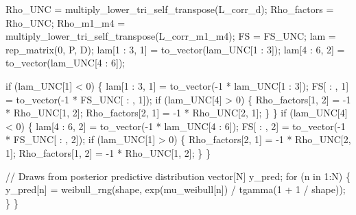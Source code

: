 \documentclass[
  letterpaper,
  DIV=11,
  numbers=noendperiod]{scrreprt}
\newenvironment{Shaded}{\begin{snugshade}}{\end{snugshade}}
\newcommand{\CommentTok}[1]{\textcolor[rgb]{0.37,0.37,0.37}{#1}}
\newcommand{\ControlFlowTok}[1]{\textcolor[rgb]{0.00,0.23,0.31}{#1}}
\newcommand{\DataTypeTok}[1]{\textcolor[rgb]{0.68,0.00,0.00}{#1}}
\newcommand{\DecValTok}[1]{\textcolor[rgb]{0.68,0.00,0.00}{#1}}
\newcommand{\NormalTok}[1]{\textcolor[rgb]{0.00,0.23,0.31}{#1}}
\begin{document}
\begin{Shaded}
\begin{Highlighting}[]
\NormalTok{  Rho\_UNC = multiply\_lower\_tri\_self\_transpose(L\_corr\_d);}
\NormalTok{  Rho\_factors = Rho\_UNC;}
\NormalTok{  Rho\_m1\_m4 = multiply\_lower\_tri\_self\_transpose(L\_corr\_m1\_m4);}
\NormalTok{  FS = FS\_UNC;}
\NormalTok{  lam = rep\_matrix(}\DecValTok{0}\NormalTok{, P, D);}
\NormalTok{  lam[}\DecValTok{1}\NormalTok{ : }\DecValTok{3}\NormalTok{, }\DecValTok{1}\NormalTok{] = to\_vector(lam\_UNC[}\DecValTok{1}\NormalTok{ : }\DecValTok{3}\NormalTok{]);}
\NormalTok{  lam[}\DecValTok{4}\NormalTok{ : }\DecValTok{6}\NormalTok{, }\DecValTok{2}\NormalTok{] = to\_vector(lam\_UNC[}\DecValTok{4}\NormalTok{ : }\DecValTok{6}\NormalTok{]);}
  
  \ControlFlowTok{if}\NormalTok{ (lam\_UNC[}\DecValTok{1}\NormalTok{] \textless{} }\DecValTok{0}\NormalTok{) \{}
\NormalTok{    lam[}\DecValTok{1}\NormalTok{ : }\DecValTok{3}\NormalTok{, }\DecValTok{1}\NormalTok{] = to\_vector({-}}\DecValTok{1}\NormalTok{ * lam\_UNC[}\DecValTok{1}\NormalTok{ : }\DecValTok{3}\NormalTok{]);}
\NormalTok{    FS[ : , }\DecValTok{1}\NormalTok{] = to\_vector({-}}\DecValTok{1}\NormalTok{ * FS\_UNC[ : , }\DecValTok{1}\NormalTok{]);}
    \ControlFlowTok{if}\NormalTok{ (lam\_UNC[}\DecValTok{4}\NormalTok{] \textgreater{} }\DecValTok{0}\NormalTok{) \{}
\NormalTok{      Rho\_factors[}\DecValTok{1}\NormalTok{, }\DecValTok{2}\NormalTok{] = {-}}\DecValTok{1}\NormalTok{ * Rho\_UNC[}\DecValTok{1}\NormalTok{, }\DecValTok{2}\NormalTok{];}
\NormalTok{      Rho\_factors[}\DecValTok{2}\NormalTok{, }\DecValTok{1}\NormalTok{] = {-}}\DecValTok{1}\NormalTok{ * Rho\_UNC[}\DecValTok{2}\NormalTok{, }\DecValTok{1}\NormalTok{];}
\NormalTok{    \}}
\NormalTok{  \}}
  \ControlFlowTok{if}\NormalTok{ (lam\_UNC[}\DecValTok{4}\NormalTok{] \textless{} }\DecValTok{0}\NormalTok{) \{}
\NormalTok{    lam[}\DecValTok{4}\NormalTok{ : }\DecValTok{6}\NormalTok{, }\DecValTok{2}\NormalTok{] = to\_vector({-}}\DecValTok{1}\NormalTok{ * lam\_UNC[}\DecValTok{4}\NormalTok{ : }\DecValTok{6}\NormalTok{]);}
\NormalTok{    FS[ : , }\DecValTok{2}\NormalTok{] = to\_vector({-}}\DecValTok{1}\NormalTok{ * FS\_UNC[ : , }\DecValTok{2}\NormalTok{]);}
    \ControlFlowTok{if}\NormalTok{ (lam\_UNC[}\DecValTok{1}\NormalTok{] \textgreater{} }\DecValTok{0}\NormalTok{) \{}
\NormalTok{      Rho\_factors[}\DecValTok{2}\NormalTok{, }\DecValTok{1}\NormalTok{] = {-}}\DecValTok{1}\NormalTok{ * Rho\_UNC[}\DecValTok{2}\NormalTok{, }\DecValTok{1}\NormalTok{];}
\NormalTok{      Rho\_factors[}\DecValTok{1}\NormalTok{, }\DecValTok{2}\NormalTok{] = {-}}\DecValTok{1}\NormalTok{ * Rho\_UNC[}\DecValTok{1}\NormalTok{, }\DecValTok{2}\NormalTok{];}
\NormalTok{    \}}
\NormalTok{  \}}

  \CommentTok{// Draws from posterior predictive distribution}
  \DataTypeTok{vector}\NormalTok{[N] y\_pred;}
  \ControlFlowTok{for}\NormalTok{ (n }\ControlFlowTok{in} \DecValTok{1}\NormalTok{:N) \{}
\NormalTok{    y\_pred[n] = weibull\_rng(shape, exp(mu\_weibull[n]) / tgamma(}\DecValTok{1}\NormalTok{ + }\DecValTok{1}\NormalTok{ / shape));}
\NormalTok{  \}}
\NormalTok{\}}
\end{Highlighting}
\end{Shaded}
\end{document}
